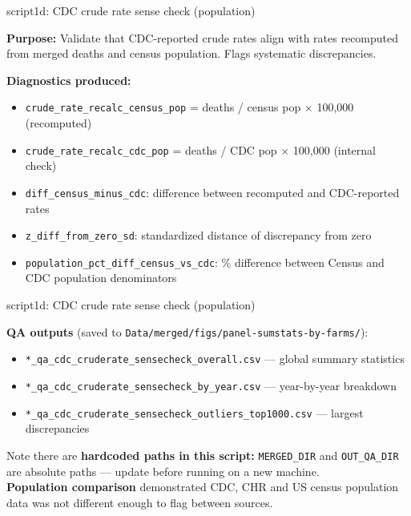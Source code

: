 \documentclass[aspectratio=169]{beamer}
\begin{document}
\begin{frame}{script1d: CDC crude rate sense check (population)}

\textbf{Purpose:} Validate that CDC-reported crude rates align with rates recomputed from merged deaths and census population. Flags systematic discrepancies.

\vspace{0.3em}
\textbf{Diagnostics produced:}
\begin{itemize}\small
    \item \texttt{crude\_rate\_recalc\_census\_pop} = deaths / census pop $\times$ 100{,}000 (recomputed)
    \item \texttt{crude\_rate\_recalc\_cdc\_pop} = deaths / CDC pop $\times$ 100{,}000 (internal check)
    \item \texttt{diff\_census\_minus\_cdc}: difference between recomputed and CDC-reported rates
    \item \texttt{z\_diff\_from\_zero\_sd}: standardized distance of discrepancy from zero
    \item \texttt{population\_pct\_diff\_census\_vs\_cdc}: \% difference between Census and CDC population denominators
\end{itemize}
\end{frame}

\begin{frame}{script1d: CDC crude rate sense check (population)}


\textbf{QA outputs} (saved to \texttt{Data/merged/figs/panel-sumstats-by-farms/}):
\begin{itemize}\small
    \item \texttt{*\_qa\_cdc\_cruderate\_sensecheck\_overall.csv} — global summary statistics
    \item \texttt{*\_qa\_cdc\_cruderate\_sensecheck\_by\_year.csv} — year-by-year breakdown
    \item \texttt{*\_qa\_cdc\_cruderate\_sensecheck\_outliers\_top1000.csv} — largest discrepancies
\end{itemize}

\vspace{0.3em}
{\small Note there are \textbf{hardcoded paths in this script:} \texttt{MERGED\_DIR} and \texttt{OUT\_QA\_DIR} are absolute paths — update before running on a new machine.} \\

\vspace{0.3em}
{\small \textbf{Population comparison} demonstrated CDC, CHR and US census population data was not different enough to flag between sources.}
\end{frame}
\end{document}
